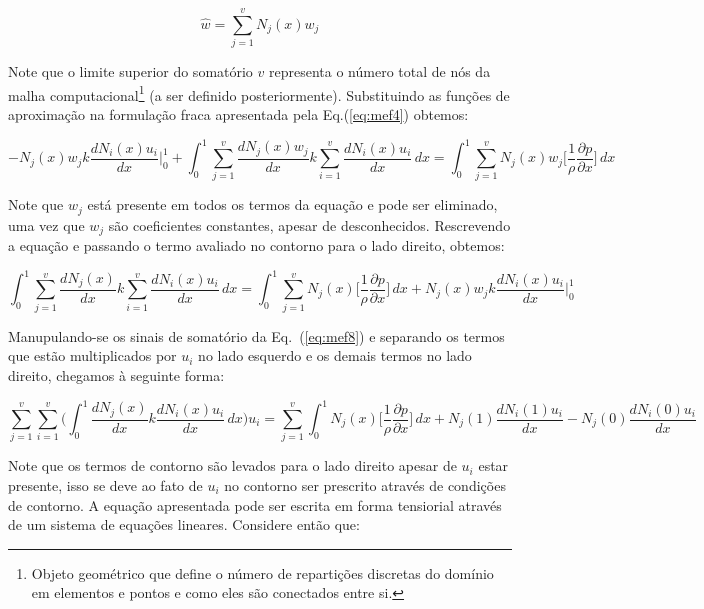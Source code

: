 \begin{equation}
	\hat{w} 
	=
	\sum\limits_{j=1}^v N_j(x) w_j 
	\label{eq:mef6}
\end{equation}

Note que o limite superior do somatório $v$ representa o número total de
nós da malha computacional\footnote{Objeto geométrico que define o
número de repartições discretas do domínio em elementos e pontos e como
eles são conectados entre si.} (a ser definido posteriormente).
Substituindo as funções de aproximação na formulação fraca apresentada
pela Eq.(\ref{eq:mef4}) obtemos:

\begin{equation}
	- N_j(x)w_j k \frac{d N_i(x) u_i}{dx} \bigg|_{0}^{1}
	+
	\int_{0}^{1}  
	\sum\limits_{j=1}^v
	\frac{dN_j(x) w_j}{dx} 
	k
	\sum\limits_{i=1}^v 
	\frac{d N_i(x) u_i}{dx} 
	\, dx
	=
	\int_{0}^{1}  
	\sum\limits_{j=1}^v
	N_j(x) w_j
	\bigg[ \frac{1}{\rho} \frac{\partial p}{\partial x} \bigg]
	\, dx
	\label{eq:mef7}
\end{equation}

Note que $w_j$ está presente em todos os termos da equação e pode ser
eliminado, uma vez que $w_j$ são coeficientes constantes, apesar de
desconhecidos. Rescrevendo a equação e passando o termo avaliado no
contorno para o lado direito, obtemos:

\begin{equation}
	\int_{0}^{1}  
	\sum\limits_{j=1}^v
	\frac{dN_j(x)}{dx} 
	k
	\sum\limits_{i=1}^v 
	\frac{d N_i(x) u_i}{dx} 
	\, dx
	=
	\int_{0}^{1}  
	\sum\limits_{j=1}^v
	N_j(x) 
	\bigg[ \frac{1}{\rho} \frac{\partial p}{\partial x} \bigg]
	\, dx
	+ 
	N_j(x)w_j k \frac{d N_i(x) u_i}{dx} \bigg|_{0}^{1}
	\label{eq:mef8}
\end{equation}

Manupulando-se os sinais de somatório da Eq.~(\ref{eq:mef8}) e separando
os termos que estão multiplicados por $u_i$ no lado esquerdo e os demais
termos no lado direito, chegamos à seguinte forma:

\begin{equation}
	\sum\limits_{j=1}^v
	\sum\limits_{i=1}^v 
	\bigg(
	\int_{0}^{1}  
	\frac{dN_j(x)}{dx} 
	k
	\frac{d N_i(x) u_i}{dx} 
	\, dx
	\bigg)
	u_i
    =
	\sum\limits_{j=1}^v
	\int_{0}^{1}  
	N_j(x) 
	\bigg[ \frac{1}{\rho} \frac{\partial p}{\partial x} \bigg]
	\, dx
	+
	N_j(1) \frac{d N_i(1) u_i}{dx} 
	- 
	N_j(0) \frac{d N_i(0) u_i}{dx}
	\label{eq:mef9}
\end{equation}

Note que os termos de contorno são levados para o lado direito apesar de
$u_i$ estar presente, isso se deve ao fato de $u_i$ no contorno ser
prescrito através de condições de contorno. A equação apresentada pode
ser escrita em forma tensiorial através de um sistema de equações
lineares. Considere então que: 

